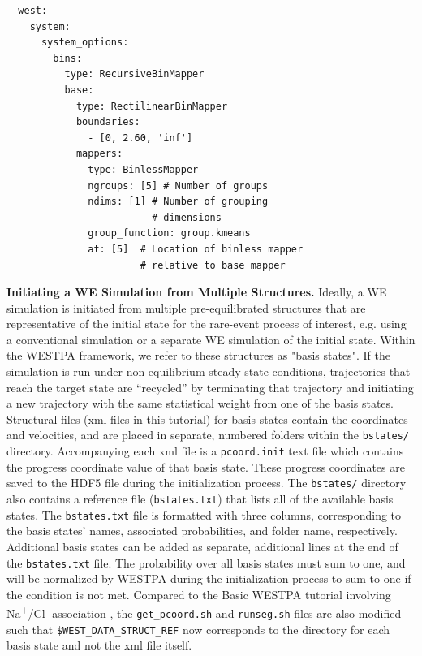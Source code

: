 \begin{verbatim}
  west:
    system:
      system_options:
        bins:
          type: RecursiveBinMapper
          base:
            type: RectilinearBinMapper
            boundaries:
              - [0, 2.60, 'inf']
            mappers:
            - type: BinlessMapper
              ngroups: [5] # Number of groups
              ndims: [1] # Number of grouping 
                         # dimensions
              group_function: group.kmeans
              at: [5]  # Location of binless mapper
                       # relative to base mapper
\end{verbatim} 

\textbf{Initiating a WE Simulation from Multiple Structures.} Ideally, a WE simulation is initiated from multiple pre-equilibrated structures that are representative of the initial state for the rare-event process of interest, e.g. using a conventional simulation or a separate WE simulation of the initial state.
Within the WESTPA framework, we refer to these structures as "basis states". 
If the simulation is run under non-equilibrium steady-state conditions, trajectories that reach the target state are “recycled” by terminating that trajectory and initiating a new trajectory with the same statistical weight from one of the basis states. 
Structural files (xml files in this tutorial) for basis states contain the coordinates and velocities, and are placed in separate, numbered folders within the \verb|bstates/| directory. 
Accompanying each xml file is a \verb|pcoord.init| text file which contains the progress coordinate value of that basis state. 
These progress coordinates are saved to the HDF5 file during the initialization process. 
The \verb|bstates/| directory also contains a reference file (\verb|bstates.txt|) that lists all of the available basis states. 
The \verb|bstates.txt| file is formatted with three columns, corresponding to the basis states’ names, associated probabilities, and folder name, respectively.
Additional basis states can be added as separate, additional lines at the end of the \verb|bstates.txt| file. 
The probability over all basis states must sum to one, and will be normalized by WESTPA during the initialization process to sum to one if the condition is not met.
Compared to the Basic WESTPA tutorial involving Na\textsuperscript{+}/Cl\textsuperscript{-} association \citep{bogetti_suite_2019}, the \verb|get_pcoord.sh| and \verb|runseg.sh| files are also modified such that \verb|$WEST_DATA_STRUCT_REF| now corresponds to the directory for each basis state and not the xml file itself.

